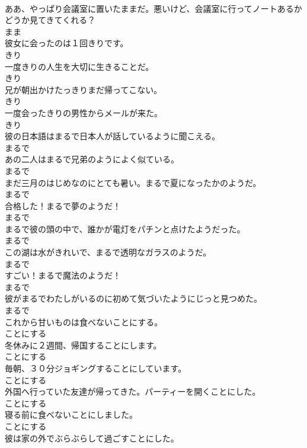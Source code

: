 \documentclass[8pt]{extreport}
\begin{document}
\begin{CJK}{UTF8}{min}
\\	ああ、やっぱり会議室に置いたままだ。悪いけど、会議室に行ってノートあるかどうか見てきてくれる？	
\\	まま
\\	彼女に会ったのは１回きりです。	
\\	きり
\\	一度きりの人生を大切に生きることだ。	
\\	きり
\\	兄が朝出かけたっきりまだ帰ってこない。	
\\	きり
\\	一度会ったきりの男性からメールが来た。	
\\	きり
\\	彼の日本語はまるで日本人が話しているように聞こえる。	
\\	まるで
\\	あの二人はまるで兄弟のようによく似ている。	
\\	まるで
\\	まだ三月のはじめなのにとても暑い。まるで夏になったかのようだ。	
\\	まるで
\\	合格した！まるで夢のようだ！	
\\	まるで
\\	まるで彼の頭の中で、誰かが電灯をパチンと点けたようだった。	
\\	まるで
\\	この湖は水がきれいで、まるで透明なガラスのようだ。	
\\	まるで
\\	すごい！まるで魔法のようだ！	
\\	まるで
\\	彼がまるでわたしがいるのに初めて気づいたようにじっと見つめた。	
\\	まるで
\\	これから甘いものは食べないことにする。	
\\	ことにする
\\	冬休みに２週間、帰国することにします。	
\\	ことにする
\\	毎朝、３０分ジョギングすることにしています。	
\\	ことにする
\\	外国へ行っていた友達が帰ってきた。パーティーを開くことにした。	
\\	ことにする
\\	寝る前に食べないことにしました。	
\\	ことにする
\\	彼は家の外でぶらぶらして過ごすことにした。	

\end{CJK}
\end{document}
